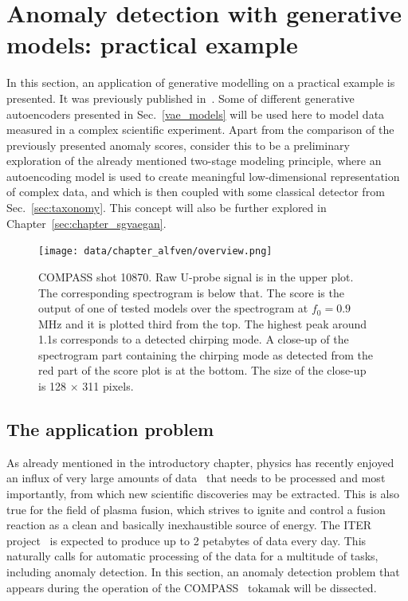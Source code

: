 \section{Anomaly detection with generative models: practical example} \label{sec:alfven}
In this section, an application of generative modelling on a practical example is presented. It was previously published in~\cite{vskvara2020detection}. Some of different generative autoencoders presented in Sec.~\ref{vae_models} will be used here to model data measured in a complex scientific experiment. Apart from the comparison of the previously presented anomaly scores, consider this to be a preliminary exploration of the already mentioned two-stage modeling principle, where an autoencoding model is used to create meaningful low-dimensional representation of complex data, and which is then coupled with some classical detector from Sec.~\ref{sec:taxonomy}. This concept will also be further explored in Chapter~\ref{sec:chapter_sgvaegan}.

\begin{figure}[t]%
  \centering
  \texttt{[image: data/chapter\_alfven/overview.png]}
  \caption{COMPASS shot 10870. Raw U-probe signal is in the upper plot. The corresponding spectrogram is below that. The score is the output of one of tested models over the spectrogram at $f_0=0.9$ MHz and it is plotted third from the top. The highest peak around 1.1s corresponds to a detected chirping mode. A close-up of the spectrogram part containing the chirping mode as detected from the red part of the score plot is at the bottom. The size of the close-up is 128 $\times$ 311 pixels.}
  \label{fig:psd}
\end{figure}

\subsection{The application problem}
As already mentioned in the introductory chapter, physics has recently enjoyed an influx of very large amounts of data~\cite{bird2011computing,ball2010data} that needs to be processed and most importantly, from which new scientific discoveries may be extracted. This is also true for the field of plasma fusion, which strives to ignite and control a fusion reaction as a clean and basically inexhaustible source of energy. The ITER project~\cite{holtkamp2007overview} is expected to produce up to 2 petabytes of data every day. This naturally calls for automatic processing of the data for a multitude of tasks, including anomaly detection. In this section, an anomaly detection problem that appears during the operation of the COMPASS~\cite{panek2015status} tokamak will be dissected.


